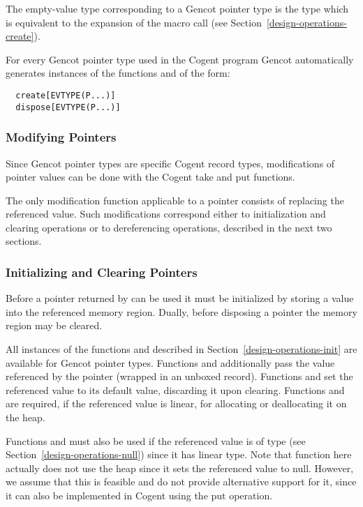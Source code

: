 The empty-value type corresponding to a Gencot pointer type  is the type  which
is equivalent to the expansion of the macro call  (see Section~\ref{design-operations-create}).

For every Gencot pointer type  used in the Cogent program Gencot automatically
generates instances of the functions  and  of the form:
\begin{verbatim}
  create[EVTYPE(P...)]
  dispose[EVTYPE(P...)]
\end{verbatim}

\subsubsection{Modifying Pointers}

Since Gencot pointer types are specific Cogent record types, modifications of pointer values can be done with the Cogent take and 
put functions.

The only modification function applicable to a pointer consists of replacing the referenced value. Such modifications correspond
either to initialization and clearing operations or to dereferencing operations, described in the next two sections.

\subsubsection{Initializing and Clearing Pointers}

Before a pointer returned by  can be used it must be initialized by storing a value into the referenced memory region.
Dually, before disposing a pointer the memory region may be cleared.

All instances of the functions  and  described in 
Section~\ref{design-operations-init} are available
for Gencot pointer types. Functions  and  additionally pass the value referenced
by the pointer (wrapped in an unboxed record). Functions  and  set the referenced
value to its default value, discarding it upon clearing. Functions  and  
are required, if the referenced value is linear, for allocating or deallocating it on the heap. 

Functions
 and  must also be used if the referenced value is of type  
(see Section~\ref{design-operations-null}) since it has linear type. Note that function  here
actually does not use the heap since it sets the referenced value to null. However, we assume that this is
feasible and do not provide alternative support for it, since it can also be implemented in Cogent using
the put operation.

